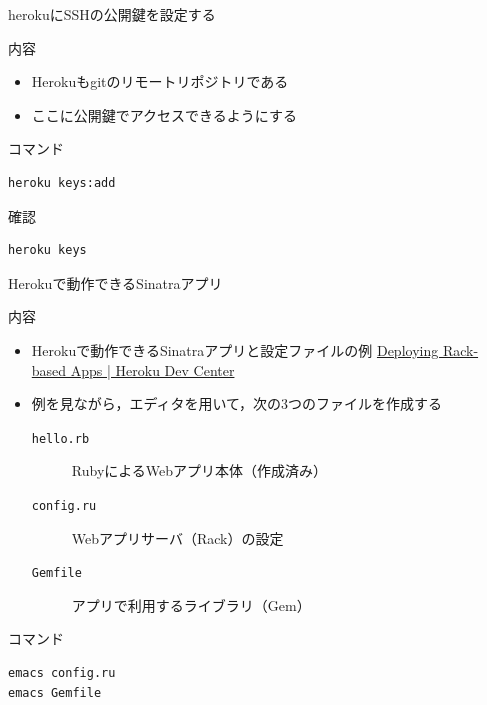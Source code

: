 \documentclass[t, aspectratio=169]{beamer}
\begin{document}
\begin{frame}[fragile,label=sec-5-2-2]{herokuにSSHの公開鍵を設定する}
 \begin{block}{内容}
\begin{itemize}
\item Herokuもgitのリモートリポジトリである
\item ここに公開鍵でアクセスできるようにする
\end{itemize}
\end{block}
\begin{block}{コマンド}
\begin{verbatim}
heroku keys:add
\end{verbatim}
\end{block}
\begin{block}{確認}
\begin{verbatim}
heroku keys
\end{verbatim}
\end{block}
\end{frame}

\begin{frame}[fragile,label=sec-5-2-3]{Herokuで動作できるSinatraアプリ}
 \begin{block}{内容}
\begin{itemize}
\item Herokuで動作できるSinatraアプリと設定ファイルの例
\href{https://devcenter.heroku.com/articles/rack#sinatra}{Deploying Rack-based Apps | Heroku Dev Center}
\item 例を見ながら，エディタを用いて，次の3つのファイルを作成する
\begin{description}
\item[{\texttt{hello.rb}}] RubyによるWebアプリ本体（作成済み）
\item[{\texttt{config.ru}}] Webアプリサーバ（Rack）の設定
\item[{\texttt{Gemfile}}] アプリで利用するライブラリ（Gem）
\end{description}
\end{itemize}
\end{block}
\begin{block}{コマンド}
\begin{verbatim}
emacs config.ru
emacs Gemfile
\end{verbatim}
\end{block}
\end{frame}
\end{document}
